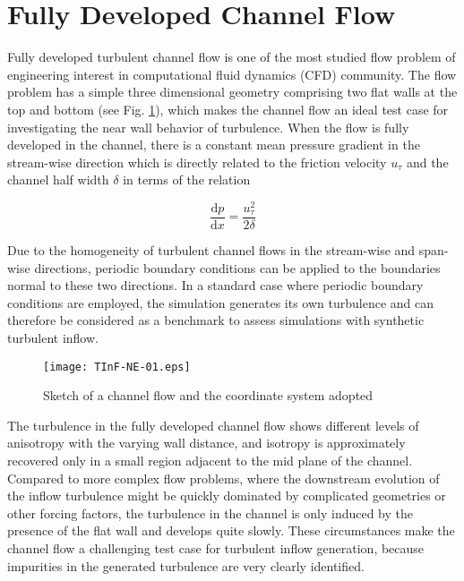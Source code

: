 \section{Fully Developed Channel Flow}

Fully developed turbulent channel flow is one of the most studied flow problem of engineering interest in computational fluid dynamics (CFD) community. The flow problem has a simple three dimensional geometry comprising two flat walls at the top and bottom (see Fig. \ref{channel}), which makes the channel flow an ideal test case for investigating the near wall behavior of turbulence. When the flow is fully developed in the channel, there is a constant mean pressure gradient in the stream-wise direction which is directly related to the friction velocity $u_{\tau}$ and the channel half width $\delta$ in terms of the relation

\begin{equation}
\frac{\mathrm{d}p}{\mathrm{d}x} = \frac{u_{\tau}^2}{2\delta}
\end{equation}

\noindent Due to the homogeneity of turbulent channel flows in the stream-wise and span-wise directions, periodic boundary conditions can be applied to the boundaries normal to these two directions. In a standard case where periodic boundary conditions are employed, the simulation generates its own turbulence and can therefore be considered as a benchmark to assess simulations with synthetic turbulent inflow. 

\begin{figure}[H]
\centering
\texttt{[image: TInF-NE-01.eps]} 
\caption{Sketch of a channel flow and the coordinate system adopted}\label{channel}
\end{figure}

The turbulence in the fully developed channel flow shows different levels of anisotropy with the varying wall distance, and isotropy is approximately recovered only in a small region adjacent to the mid plane of the channel. Compared to more complex flow problems, where the downstream evolution of the inflow turbulence might be quickly dominated by complicated geometries or other forcing factors, the turbulence in the channel is only induced by the presence of the flat wall and develops quite slowly. These circumstances make the channel flow a challenging test case for turbulent inflow generation, because impurities in the generated turbulence are very clearly identified.


